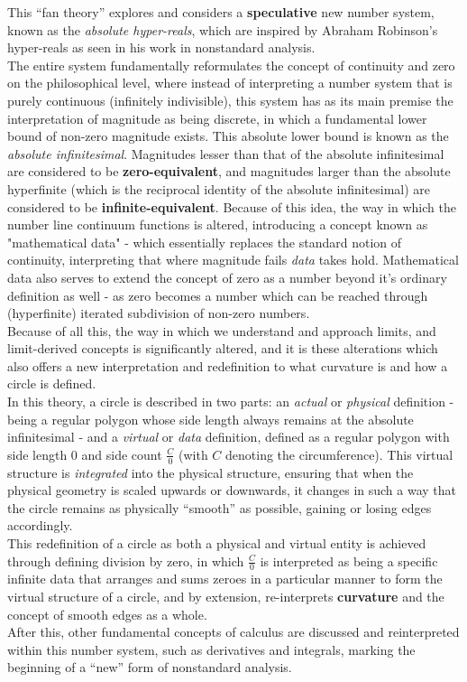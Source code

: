 \documentclass{article}
\begin{document}
This ``fan theory'' explores and considers a \textbf{speculative} new number system, known as the \emph{absolute hyper-reals}, which are inspired by Abraham Robinson's hyper-reals as seen in his work in nonstandard analysis.\\ The entire system fundamentally reformulates the concept of continuity and zero on the philosophical level, where instead of interpreting a number system that is purely continuous (infinitely indivisible), this system has as its main premise the interpretation of magnitude as being discrete, in which a fundamental lower bound of non-zero magnitude exists. This absolute lower bound is known as the \emph{absolute infinitesimal}. Magnitudes lesser than that of the absolute infinitesimal are considered to be \textbf{zero-equivalent}, and magnitudes larger than the absolute hyperfinite (which is the reciprocal identity of the absolute infinitesimal) are considered to be \textbf{infinite-equivalent}. Because of this idea, the way in which the number line continuum functions is altered, introducing a concept known as "mathematical data" - which essentially replaces the standard notion of continuity, interpreting that where magnitude fails \textit{data} takes hold. Mathematical data also serves to extend the concept of zero as a number beyond it's ordinary definition as well - as zero becomes a number which can be reached through (hyperfinite) iterated subdivision of non-zero numbers.\\Because of all this, the way in which we understand and approach limits, and limit-derived concepts is significantly altered, and it is these alterations which also offers a new interpretation and redefinition to what curvature is and how a circle is defined. \\In this theory, a circle is described in two parts: an \emph{actual} or \emph{physical} definition - being a regular polygon whose side length always remains at the absolute infinitesimal - and a \emph{virtual} or \emph{data} definition, defined as a regular polygon with side length $0$ and side count $\frac{C}{0}$ (with $C$ denoting the circumference). This virtual structure is \emph{integrated} into the physical structure, ensuring that when the physical geometry is scaled upwards or downwards, it changes in such a way that the circle remains as physically ``smooth'' as possible, gaining or losing edges accordingly.\\This redefinition of a circle as both a physical and virtual entity is achieved through defining division by zero, in which $\frac{C}{0}$ is interpreted as being a specific infinite data that arranges and sums zeroes in a particular manner to form the virtual structure of a circle, and by extension, re-interprets \textbf{curvature} and the concept of smooth edges as a whole.\\After this, other fundamental concepts of calculus are discussed and reinterpreted within this number system, such as derivatives and integrals, marking the beginning of a ``new'' form of nonstandard analysis.
\end{document}
